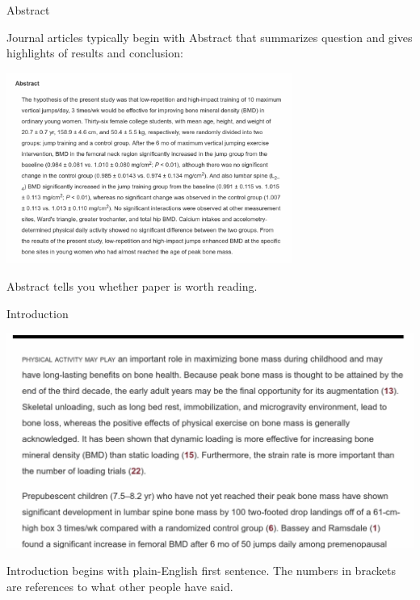 \documentclass[unknownkeysallowed]{beamer}\usepackage[]{graphicx}\usepackage[]{color}
\begin{document}
\begin{frame}[fragile]{Abstract}
  
  Journal articles typically begin with Abstract that summarizes
  question and gives highlights of results and conclusion:
  
\includegraphics[width=0.7\textwidth]{abstract}  
  
Abstract tells you whether paper is worth reading.
\end{frame}

\begin{frame}[fragile]{Introduction}
  
  \includegraphics[width=\textwidth]{intro}
  
Introduction begins with plain-English first sentence. The numbers in
brackets are references to what other people have said.  
  
\end{frame}
\end{document}
